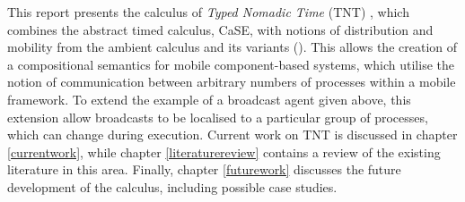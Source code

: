 This report presents the calculus of \emph{Typed Nomadic Time} (TNT)
\cite{hughes:nt}, which combines the abstract timed calculus, CaSE, with
notions of distribution and mobility from the ambient calculus and its
variants (\cite{sangiorgi:mobsafeambients,controlledamb02}).  This
allows the creation of a compositional semantics for mobile
component-based systems, which utilise the notion of communication
between arbitrary numbers of processes within a mobile framework.  To
extend the example of a broadcast agent given above, this extension
allow broadcasts to be localised to a particular group of processes,
which can change during execution.  Current work on TNT is discussed in
chapter \ref{currentwork}, while chapter \ref{literaturereview} contains
a review of the existing literature in this area.  Finally, chapter
\ref{futurework} discusses the future development of the calculus,
including possible case studies.
